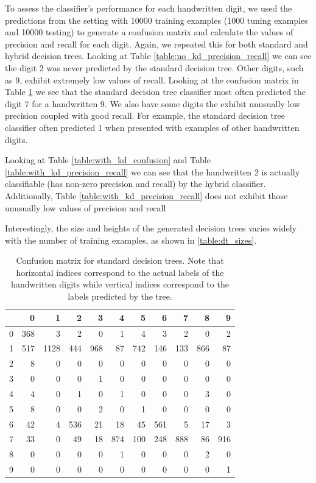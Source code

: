 To assess the classifier's performance for each handwritten digit, we used the predictions from the setting with 10000 training examples (1000 tuning examples and 10000 testing) to generate a confusion matrix and calculate the values of precision and recall for each digit.  Again, we repeated this for both standard and hybrid decision trees.  Looking at Table \ref{table:no_kd_precision_recall} we can see the digit 2 was never predicted by the standard decision tree.  Other digits, such as 9, exhibit extremely low values of recall. Looking at the confusion matrix in Table \ref{table:no_kd_confusion} we see that the standard decision tree classifier most often predicted the digit 7 for a handwritten 9.  We also have some digits the exhibit unusually low precision coupled with good recall.  For example, the standard decision tree classifier often predicted 1 when presented with examples of other handwritten digits.

Looking at Table \ref{table:with_kd_confusion} and Table \ref{table:with_kd_precision_recall} we can see that the handwritten 2 is actually classifiable (has non-zero precision and recall) by the hybrid classifier.  Additionally, Table \ref{table:with_kd_precision_recall} does not exhibit those unusually low values of precision and recall

Interestingly, the size and heights of the generated decision trees varies widely with the number of training examples, as shown in \ref{table:dt_sizes}.

\begin{table}
	\begin{tabular}{r|rrrrrrrrrr}
		&   0 &    1 &   2 &   3 &   4 &   5 &   6 &   7 &   8 &   9 \\
		\hline
		0 & 368 &    3 &   2 &   0 &   1 &   4 &   3 &   2 &   0 &   2 \\
		1 & 517 & 1128 & 444 & 968 &  87 & 742 & 146 & 133 & 866 &  87 \\
		2 &   8 &    0 &   0 &   0 &   0 &   0 &   0 &   0 &   0 &   0 \\
		3 &   0 &    0 &   0 &   1 &   0 &   0 &   0 &   0 &   0 &   0 \\
		4 &   4 &    0 &   1 &   0 &   1 &   0 &   0 &   0 &   3 &   0 \\
		5 &   8 &    0 &   0 &   2 &   0 &   1 &   0 &   0 &   0 &   0 \\
		6 &  42 &    4 & 536 &  21 &  18 &  45 & 561 &   5 &  17 &   3 \\
		7 &  33 &    0 &  49 &  18 & 874 & 100 & 248 & 888 &  86 & 916 \\
		8 &   0 &    0 &   0 &   0 &   1 &   0 &   0 &   0 &   2 &   0 \\
		9 &   0 &    0 &   0 &   0 &   0 &   0 &   0 &   0 &   0 &   1 \\
	\end{tabular}
	\caption{Confusion matrix for standard decision trees.  Note that horizontal indices correspond to the actual labels of the handwritten digits while vertical indices correspond to the labels predicted by the tree.}
	\label{table:no_kd_confusion}
\end{table}

